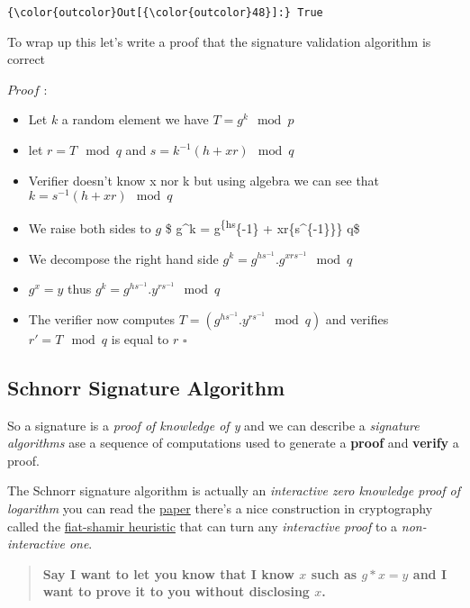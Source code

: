 \documentclass[11pt]{article}
\begin{document}
\begin{Verbatim}[commandchars=\\\{\}]
{\color{outcolor}Out[{\color{outcolor}48}]:} True
\end{Verbatim}
            
    To wrap up this let's write a proof that the signature validation
algorithm is correct

\(Proof\) :

\begin{itemize}
\item
  Let \(k\) a random element we have \(T = g^k \mod p\)
\item
  let \(r = T \mod q\) and \(s = k^{-1} (h+xr) \mod q\)
\item
  Verifier doesn't know x nor k but using algebra we can see that
  \(k = s^{-1} (h+xr) \mod q\)
\item
  We raise both sides to \(g\) \$ g\^{}k = g\textsuperscript{\{hs}\{-1\}
  + xr\{s\^{}\{-1\}\}\} \mod q\$
\item
  We decompose the right hand side
  \(g^k = g^{hs^{-1}} . g^{xrs^{-1}} \mod q\)
\item
  \(g^x = y\) thus \(g^k = g^{hs^{-1}} . y^{rs^{-1}} \mod q\)
\item
  The verifier now computes \(T = (g^{hs^{-1}} . y^{rs^{-1}} \mod q)\)
  and verifies \(r' = T \mod q\) is equal to \(r\) \(\square\)
\end{itemize}

    \subsection{Schnorr Signature
Algorithm}\label{schnorr-signature-algorithm}

So a signature is a \emph{proof of knowledge of y} and we can describe a
\emph{signature algorithms} ase a sequence of computations used to
generate a \textbf{proof} and \textbf{verify} a proof.

The Schnorr signature algorithm is actually an \emph{interactive zero
knowledge proof of logarithm} you can read the
\href{https://pdfs.semanticscholar.org/8d69/c06d48b618a090dd19185aea7a13def894a5.pdf}{paper}
there's a nice construction in cryptography called the
\href{https://pdfs.semanticscholar.org/b904/6d002da153a6fe9b06d469da4efffdfcb9c6.pdf}{fiat-shamir
heuristic} that can turn any \emph{interactive proof} to a
\emph{non-interactive one}.

\begin{quote}
\textbf{Say I want to let you know that I know \(x\) such as \(g*x = y\)
and I want to prove it to you without disclosing \(x\).}
\end{quote}
\end{document}
